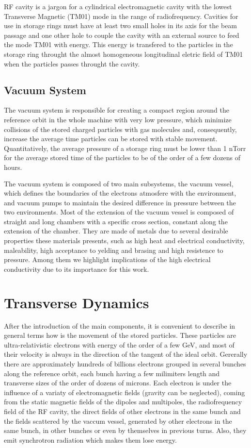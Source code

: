     RF cavity is a jargon for a cylindrical electromagnetic cavity with the lowest Transverse Magnetic (TM01) mode in the range of radiofrequency. Cavities for use in storage rings must have at least two small holes in its axis for the beam passage and one other hole to couple the cavity with an external source to feed the mode TM01 with energy. This energy is transfered to the particles in the storage ring throught the almost homogeneous longitudinal eletric field of TM01 when the particles passes throught the cavity.

\subsection{Vacuum System}

    The vacuum system is responsible for creating a compact region around the reference orbit in the whole machine with very low pressure, which minimize collisions of the stored charged particles with gas molecules and, consequently, increase the average time particles can be stored with stable movement. Quantitatively, the average pressure of a storage ring must be lower than 1 nTorr for the average stored time of the particles to be of the order of a few dozens of hours.

    The vacuum system is composed of two main subsystems, the vacuum vessel, which defines the boundaries of the electrons atmosfere with the environment, and vacuum pumps to maintain the desired difference in pressure between the two environments. Most of the extension of the vacuum vessel is composed of straight and long chambers with a specific cross section, constant along the extension of the chamber. They are made of metals due to several desirable properties these materials presents, such as high heat and electrical conductivity, maleability, high acceptance to yelding and brasing and high resistence to pressure. Among them we highlight implications of the high electrical conductivity due to its importance for this work.

\section{Transverse Dynamics}

    After the introduction of the main components, it is convenient to describe in general terms how is the movement of the stored particles. These particles are ultra-relativistic electrons with energy of the order of a few \si{GeV}, and most of their velocity is always in the direction of the tangent of the ideal orbit. Gererally there are approximately hundreds of billions electrons grouped in several bunches along the reference orbit, each bunch having a few milimiters length and transverse sizes of the order of dozens of microns. Each electron is under the influence of a variaty of electromagnetic fields (gravity can be neglected), coming from the static magnetic fields of the dipoles and multipoles, the radiofrequency field of the RF cavity, the direct fields of other electrons in the same bunch and the fields scattered by the vaccum vessel, generated by other electrons in the same bunch, in other bunches or even by themselves in previous turns. Also, they emit synchrotron radiation which makes them lose energy.

